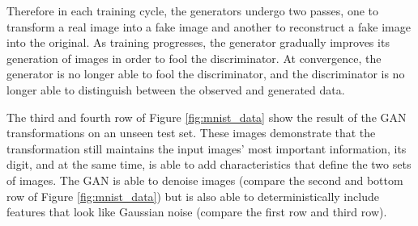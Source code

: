\begin{mdframed}[backgroundcolor=blue!20]
Therefore in each training cycle, the generators undergo two passes, one to transform a real image into a fake image and another to reconstruct a fake image into the original. As training progresses, the generator gradually improves its generation of images in order to fool the discriminator. At convergence, the generator is no longer able to fool the discriminator, and the discriminator is no longer able to distinguish between the observed and generated data.

  The third and fourth row of Figure \ref{fig:mnist_data} show the result of the GAN transformations on an unseen test set. These images demonstrate that the transformation still maintains the input images' most important information, its digit, and at the same time, is able to add characteristics that define the two sets of images. The GAN is able to denoise images (compare the second and bottom row of Figure \ref{fig:mnist_data}) but is also able to deterministically include features that look like Gaussian noise (compare the first row and third row).
  \label{box1:mnist}
  \end{mdframed}
